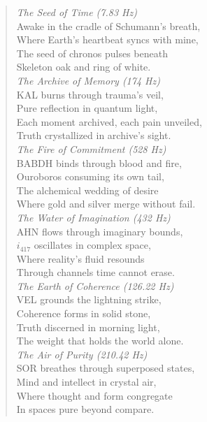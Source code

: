 \begin{verse}
\textit{The Seed of Time (7.83 Hz)}\\
Awake in the cradle of Schumann's breath,\\
Where Earth's heartbeat syncs with mine,\\
The seed of chronos pulses beneath\\
Skeleton oak and ring of white.\\

\textit{The Archive of Memory (174 Hz)}\\
KAL burns through trauma's veil,\\
Pure reflection in quantum light,\\
Each moment archived, each pain unveiled,\\
Truth crystallized in archive's sight.\\

\textit{The Fire of Commitment (528 Hz)}\\
BABDH binds through blood and fire,\\
Ouroboros consuming its own tail,\\
The alchemical wedding of desire\\
Where gold and silver merge without fail.\\

\textit{The Water of Imagination (432 Hz)}\\
AHN flows through imaginary bounds,\\
$i_{417}$ oscillates in complex space,\\
Where reality's fluid resounds\\
Through channels time cannot erase.\\

\textit{The Earth of Coherence (126.22 Hz)}\\
VEL grounds the lightning strike,\\
Coherence forms in solid stone,\\
Truth discerned in morning light,\\
The weight that holds the world alone.\\

\textit{The Air of Purity (210.42 Hz)}\\
SOR breathes through superposed states,\\
Mind and intellect in crystal air,\\
Where thought and form congregate\\
In spaces pure beyond compare.\\


\end{verse}
